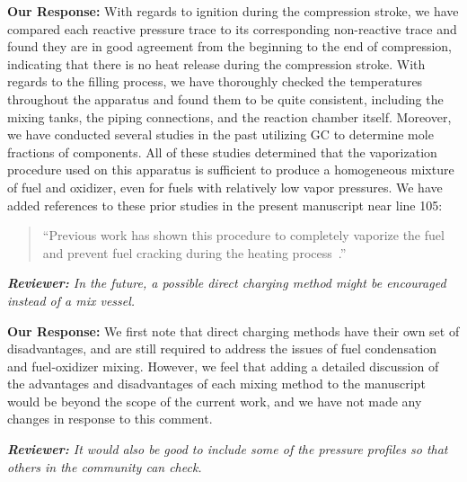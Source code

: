 \documentclass{article}
\newenvironment{reviewer}{\vspace{0.5\baselineskip}\begingroup\itshape\textbf{Reviewer:}}{\endgroup\vspace{0.5\baselineskip}}
\newenvironment{response}{\vspace{0.5\baselineskip}\textbf{Our Response:}}{\vspace{0.5\baselineskip}}
\begin{document}
\begin{response}
    With regards to ignition during the compression stroke, we have compared each reactive pressure
    trace to its corresponding non-reactive trace and found they are in good agreement from the
    beginning to the end of compression, indicating that there is no heat release during the
    compression stroke. With regards to the filling process, we have thoroughly checked the
    temperatures throughout the apparatus and found them to be quite consistent, including the
    mixing tanks, the piping connections, and the reaction chamber itself. Moreover, we have
    conducted several studies in the past utilizing GC to determine mole fractions of components.
    All of these studies determined that the vaporization procedure used on this apparatus is
    sufficient to produce a homogeneous mixture of fuel and oxidizer, even for fuels with relatively
    low vapor pressures. We have added references to these prior studies in the present manuscript
    near line 105:

    \begin{quote}
        ``Previous work has shown this procedure to completely vaporize the fuel and prevent fuel
        cracking during the heating process~\cite{Weber2011a,Kumar2009,Das2012}.''
    \end{quote}
\end{response}

\begin{reviewer}
    In the future, a possible direct charging method might be encouraged instead of a mix vessel.
\end{reviewer}

\begin{response}
    We first note that direct charging methods have their own set of disadvantages, and are still
    required to address the issues of fuel condensation and fuel-oxidizer mixing. However, we feel
    that adding a detailed discussion of the advantages and disadvantages of each mixing method to
    the manuscript would be beyond the scope of the current work, and we have not made any changes
    in response to this comment.
\end{response}

\begin{reviewer}
    It would also be good to include some of the pressure profiles so that others in the community
    can check.
\end{reviewer}
\end{document}
